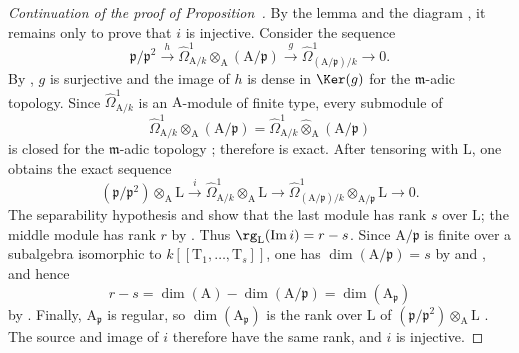 \begin{proof}[Continuation of the proof of Proposition~{\rm{}}]
By the lemma and the diagram , it remains only to prove that $i$ is injective.
Consider the sequence
\begin{equation}
\label{0.22.7.2.6}
  \mathfrak{p}/\mathfrak{p}^2\xrightarrow{h}
  \widehat{\Omega}^1_{\mathrm{A}/k}\widehat{\otimes}_\mathrm{A}(\mathrm{A}/\mathfrak{p})
  \xrightarrow{g}\widehat{\Omega}^1_{(\mathrm{A}/\mathfrak{p})/k}\to 0.
  \tag{22.7.2.6}
\end{equation}
By , $g$ is surjective and the image of $h$ is dense in $\Ker(g)$ for the $\mathfrak{m}$-adic topology.
Since $\widehat{\Omega}^1_{\mathrm{A}/k}$ is an $\mathrm{A}$-module of finite type, every submodule of
\[
  \widehat{\Omega}^1_{\mathrm{A}/k}\otimes_\mathrm{A}(\mathrm{A}/\mathfrak{p})
  =\widehat{\Omega}^1_{\mathrm{A}/k}\widehat{\otimes}_\mathrm{A}(\mathrm{A}/\mathfrak{p})
\]
is closed for the $\mathfrak{m}$-adic topology ; therefore  is exact.
After tensoring with $\mathrm{L}$, one obtains the exact sequence
\[
  (\mathfrak{p}/\mathfrak{p}^2)\otimes_\mathrm{A}\mathrm{L}\xrightarrow{i}
  \widehat{\Omega}^1_{\mathrm{A}/k}\otimes_\mathrm{A}\mathrm{L}\to
  \widehat{\Omega}^1_{(\mathrm{A}/\mathfrak{p})/k}\otimes_{\mathrm{A}/\mathfrak{p}}\mathrm{L}\to 0.
\]
The separability hypothesis and  show that the last module has rank $s$ over $\mathrm{L}$; the middle module has rank $r$ by .
Thus $\rg_\mathrm{L}(\operatorname{Im}i)=r-s$.
Since $\mathrm{A}/\mathfrak{p}$ is finite over a subalgebra isomorphic to $k[[\mathrm{T}_1,\ldots,\mathrm{T}_s]]$, one has $\dim(\mathrm{A}/\mathfrak{p})=s$ by  and , and hence
\[
  r-s=\dim(\mathrm{A})-\dim(\mathrm{A}/\mathfrak{p})=\dim(\mathrm{A}_\mathfrak{p})
\]
by .
Finally, $\mathrm{A}_\mathfrak{p}$ is regular, so $\dim(\mathrm{A}_\mathfrak{p})$ is the rank over $\mathrm{L}$ of
$(\mathfrak{p}/\mathfrak{p}^2)\otimes_\mathrm{A}\mathrm{L}$ .
The source and image of $i$ therefore have the same rank, and $i$ is injective.
\end{proof}

